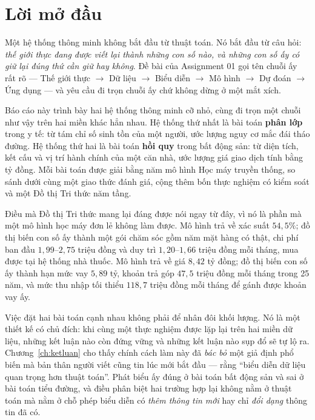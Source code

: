 \chapter*{Lời mở đầu}

Một hệ thống thông minh không bắt đầu từ thuật toán. Nó bắt đầu từ câu hỏi:
\emph{thế giới thực đang được viết lại thành những con số nào, và những con số
ấy có giữ lại đúng thứ cần giữ hay không}. Đề bài của Assignment 01 gọi tên
chuỗi ấy rất rõ --- Thế giới thực $\rightarrow$ Dữ liệu $\rightarrow$ Biểu diễn
$\rightarrow$ Mô hình $\rightarrow$ Dự đoán $\rightarrow$ Ứng dụng --- và yêu
cầu đi trọn chuỗi ấy chứ không dừng ở một mắt xích.

Báo cáo này trình bày hai hệ thống thông minh cỡ nhỏ, cùng đi trọn một chuỗi
như vậy trên hai miền khác hẳn nhau. Hệ thống thứ nhất là bài toán
\textbf{phân lớp} trong y tế: từ tám chỉ số sinh tồn của một người, ước lượng
nguy cơ mắc đái tháo đường. Hệ thống thứ hai là bài toán \textbf{hồi quy} trong
bất động sản: từ diện tích, kết cấu và vị trí hành chính của một căn nhà, ước
lượng giá giao dịch tính bằng tỷ đồng. Mỗi bài toán được giải bằng năm mô hình
Học máy truyền thống, so sánh dưới cùng một giao thức đánh giá, cộng thêm bốn
thực nghiệm có kiểm soát và một Đồ thị Tri thức năm tầng.

Điều mà Đồ thị Tri thức mang lại đáng được nói ngay từ đây, vì nó là phần mà
một mô hình học máy đơn lẻ không làm được. Mô hình trả về xác suất $54{,}5\%$;
đồ thị biến con số ấy thành một gói chăm sóc gồm năm mặt hàng có thật, chi phí
ban đầu $1{,}99$--$2{,}75$ triệu đồng và duy trì $1{,}20$--$1{,}66$ triệu đồng
mỗi tháng, mua được tại hệ thống nhà thuốc. Mô hình trả về giá $8{,}42$ tỷ
đồng; đồ thị biến con số ấy thành hạn mức vay $5{,}89$ tỷ, khoản trả góp
$47{,}5$ triệu đồng mỗi tháng trong 25 năm, và mức thu nhập tối thiểu
$118{,}7$ triệu đồng mỗi tháng để gánh được khoản vay ấy.

Việc đặt hai bài toán cạnh nhau không phải để nhân đôi khối lượng. Nó là một
thiết kế có chủ đích: khi cùng một thực nghiệm được lặp lại trên hai miền dữ
liệu, những kết luận nào còn đứng vững và những kết luận nào sụp đổ sẽ tự lộ
ra. Chương~\ref{ch:ketluan} cho thấy chính cách làm này đã \emph{bác bỏ} một
giả định phổ biến mà bản thân người viết cũng tin lúc mới bắt đầu --- rằng
``biểu diễn dữ liệu quan trọng hơn thuật toán''. Phát biểu ấy đúng ở bài toán
bất động sản và sai ở bài toán tiểu đường, và điều phân biệt hai trường hợp lại
không nằm ở thuật toán mà nằm ở chỗ phép biểu diễn có \emph{thêm thông tin mới}
hay chỉ \emph{đổi dạng} thông tin đã có.

